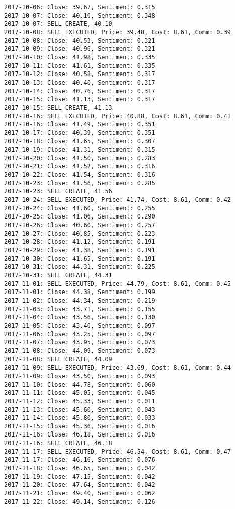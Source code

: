 \documentclass[11pt]{article}
\begin{document}
\begin{Verbatim}[commandchars=\\\{\}]
2017-10-06: Close: 39.67, Sentiment: 0.315
2017-10-07: Close: 40.10, Sentiment: 0.348
2017-10-07: SELL CREATE, 40.10
2017-10-08: SELL EXECUTED, Price: 39.48, Cost: 8.61, Comm: 0.39
2017-10-08: Close: 40.53, Sentiment: 0.321
2017-10-09: Close: 40.96, Sentiment: 0.321
2017-10-10: Close: 41.98, Sentiment: 0.335
2017-10-11: Close: 41.61, Sentiment: 0.335
2017-10-12: Close: 40.58, Sentiment: 0.317
2017-10-13: Close: 40.40, Sentiment: 0.317
2017-10-14: Close: 40.76, Sentiment: 0.317
2017-10-15: Close: 41.13, Sentiment: 0.317
2017-10-15: SELL CREATE, 41.13
2017-10-16: SELL EXECUTED, Price: 40.88, Cost: 8.61, Comm: 0.41
2017-10-16: Close: 41.49, Sentiment: 0.351
2017-10-17: Close: 40.39, Sentiment: 0.351
2017-10-18: Close: 41.65, Sentiment: 0.307
2017-10-19: Close: 41.31, Sentiment: 0.315
2017-10-20: Close: 41.50, Sentiment: 0.283
2017-10-21: Close: 41.52, Sentiment: 0.316
2017-10-22: Close: 41.54, Sentiment: 0.316
2017-10-23: Close: 41.56, Sentiment: 0.285
2017-10-23: SELL CREATE, 41.56
2017-10-24: SELL EXECUTED, Price: 41.74, Cost: 8.61, Comm: 0.42
2017-10-24: Close: 41.60, Sentiment: 0.255
2017-10-25: Close: 41.06, Sentiment: 0.290
2017-10-26: Close: 40.60, Sentiment: 0.257
2017-10-27: Close: 40.85, Sentiment: 0.223
2017-10-28: Close: 41.12, Sentiment: 0.191
2017-10-29: Close: 41.38, Sentiment: 0.191
2017-10-30: Close: 41.65, Sentiment: 0.191
2017-10-31: Close: 44.31, Sentiment: 0.225
2017-10-31: SELL CREATE, 44.31
2017-11-01: SELL EXECUTED, Price: 44.79, Cost: 8.61, Comm: 0.45
2017-11-01: Close: 44.38, Sentiment: 0.199
2017-11-02: Close: 44.34, Sentiment: 0.219
2017-11-03: Close: 43.71, Sentiment: 0.155
2017-11-04: Close: 43.56, Sentiment: 0.130
2017-11-05: Close: 43.40, Sentiment: 0.097
2017-11-06: Close: 43.25, Sentiment: 0.097
2017-11-07: Close: 43.95, Sentiment: 0.073
2017-11-08: Close: 44.09, Sentiment: 0.073
2017-11-08: SELL CREATE, 44.09
2017-11-09: SELL EXECUTED, Price: 43.69, Cost: 8.61, Comm: 0.44
2017-11-09: Close: 43.50, Sentiment: 0.093
2017-11-10: Close: 44.78, Sentiment: 0.060
2017-11-11: Close: 45.05, Sentiment: 0.045
2017-11-12: Close: 45.33, Sentiment: 0.011
2017-11-13: Close: 45.60, Sentiment: 0.043
2017-11-14: Close: 45.80, Sentiment: 0.033
2017-11-15: Close: 45.36, Sentiment: 0.016
2017-11-16: Close: 46.18, Sentiment: 0.016
2017-11-16: SELL CREATE, 46.18
2017-11-17: SELL EXECUTED, Price: 46.54, Cost: 8.61, Comm: 0.47
2017-11-17: Close: 46.16, Sentiment: 0.076
2017-11-18: Close: 46.65, Sentiment: 0.042
2017-11-19: Close: 47.15, Sentiment: 0.042
2017-11-20: Close: 47.64, Sentiment: 0.042
2017-11-21: Close: 49.40, Sentiment: 0.062
2017-11-22: Close: 49.14, Sentiment: 0.126

\end{Verbatim}
\end{document}
